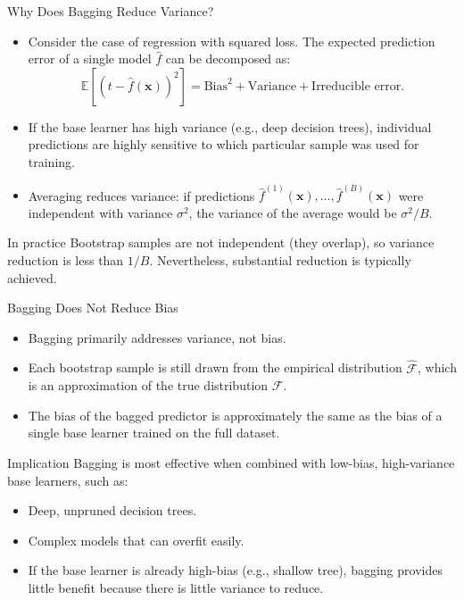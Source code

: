 \begin{frame}{Why Does Bagging Reduce Variance?}
  \begin{itemize}
    \item Consider the case of regression with squared loss. The expected prediction error of
          a single model $\hat{f}$ can be decomposed as:
          \[
          \mathbb{E}[(t - \hat{f}(\mathbf{x}))^2] = \text{Bias}^2 + \text{Variance} + \text{Irreducible error}.
          \]
    \item If the base learner has high variance (e.g., deep decision trees), individual predictions
          are highly sensitive to which particular sample was used for training.
    \item Averaging reduces variance: if predictions $\hat{f}^{(1)}(\mathbf{x}), \ldots, \hat{f}^{(B)}(\mathbf{x})$
          were independent with variance $\sigma^2$, the variance of the average would be $\sigma^2/B$.
  \end{itemize}
  \begin{alertblock}{In practice}
    Bootstrap samples are \alert{not independent} (they overlap), so variance reduction is less
    than $1/B$. Nevertheless, substantial reduction is typically achieved.
  \end{alertblock}
\end{frame}

\begin{frame}{Bagging Does Not Reduce Bias}
  \begin{itemize}
    \item Bagging primarily addresses \alert{variance}, not bias.
    \item Each bootstrap sample is still drawn from the empirical distribution $\hat{\mathcal{F}}$,
          which is an approximation of the true distribution $\mathcal{F}$.
    \item The bias of the bagged predictor is approximately the same as the bias of a single
          base learner trained on the full dataset.
  \end{itemize}
  \begin{block}{Implication}
    Bagging is most effective when combined with \alert{low-bias, high-variance} base learners,
    such as:
    \begin{itemize}
      \item Deep, unpruned decision trees.
      \item Complex models that can overfit easily.
    \end{itemize}
  \end{block}
  \begin{itemize}
    \item If the base learner is already high-bias (e.g., shallow tree), bagging provides
          little benefit because there is little variance to reduce.
  \end{itemize}
\end{frame}

